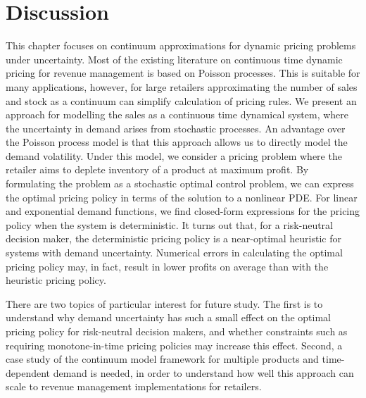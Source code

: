 \documentclass[main.tex]{subfiles}
\begin{document}

\section{Discussion}\label{sec:cts_conclusion}
This chapter focuses on continuum approximations for dynamic
pricing problems under uncertainty.
Most of the existing literature on continuous time dynamic pricing for
revenue management is based on Poisson
processes. This is suitable for many applications,
however, for large retailers approximating the number of sales and
stock as a continuum can simplify calculation of pricing rules.
We present an approach for modelling the sales as a continuous time
dynamical system, where the uncertainty in demand arises from
stochastic processes.
An advantage over the Poisson process model is that this approach
allows us to directly model the demand volatility.
Under this model, we consider a pricing problem where the retailer
aims to deplete  inventory of a product at maximum profit.
By formulating the problem as a stochastic optimal control problem,
we can express the optimal pricing policy in terms of the solution to
a nonlinear PDE.\@
For linear and exponential demand functions, we find closed-form
expressions for the pricing policy when the system is deterministic.
It turns out that, for a risk-neutral decision maker, the
deterministic pricing policy is a near-optimal heuristic for systems
with demand uncertainty.
Numerical errors in calculating the optimal pricing policy
may, in fact, result in lower profits on average than with the heuristic
pricing policy.

There are two topics of particular interest for future study.
The first is to understand why demand uncertainty has such a
small effect on the optimal pricing policy for risk-neutral decision
makers, and whether constraints such as requiring monotone-in-time pricing
policies may increase this effect. Second, a case study of the continuum
model framework for multiple products and time-dependent demand is
needed, in
order to understand how well this approach can scale to revenue
management implementations for retailers.




\biblio{} %
\end{document}
